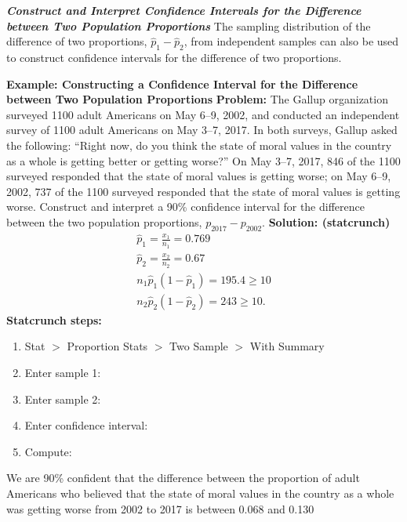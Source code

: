 \documentclass{report}
\begin{document}
    \pagebreak \bigbreak \noindent 
    \textbf{\textit{Construct and Interpret Confidence Intervals for the Difference between Two Population Proportions}}
    \bigbreak \noindent 
    The sampling distribution of the difference of two proportions, $\hat{p}_1 - \hat{p}_2$, from independent samples can also be used to construct confidence intervals for the difference of two proportions.
    \bigbreak \noindent 
    \begin{mdframed}
      \textbf{Example: Constructing a Confidence Interval for the Difference between Two Population Proportions}
      \bigbreak \noindent 
      \textbf{Problem:}
      The Gallup organization surveyed 1100 adult Americans on May 6–9, 2002, and conducted an independent survey of 1100 adult Americans on May 3–7, 2017. In both surveys, Gallup asked the following: “Right now, do you think the state of moral values in the country as a whole is getting better or getting worse?” On May 3–7, 2017, 846 of the 1100 surveyed responded that the state of moral values is getting worse; on May 6–9, 2002, 737 of the 1100 surveyed responded that the state of moral values is getting worse. Construct and interpret a 90\% confidence interval for the difference between the two population proportions, \(p_{2017} - p_{2002}\).
      \bigbreak \noindent 
      \textbf{Solution: (statcrunch)}
      \begin{align*}
          \hat{p}_{1} = \frac{x_{1}}{n_{1}} = 0.769 \\
          \hat{p}_{2} = \frac{x_{2}}{n_{2}} = 0.67 \\
          n_{1}\hat{p}_{1}(1-\hat{p}_{1}) = 195.4 \geq 10 \\
          n_{2}\hat{p}_{2}(1-\hat{p}_{2}) = 243 \geq 10
      .\end{align*}
      \textbf{Statcrunch steps:}
      \begin{enumerate}
          \item Stat $> $ Proportion Stats $> $ Two Sample $> $ With Summary
         \item Enter sample 1:
         \item Enter sample 2:
        \item Enter confidence interval:
        \item Compute:
      \end{enumerate}
      We are 90\% confident that the difference between the proportion of adult Americans who believed that the state of moral values in the country as a whole was getting worse from 2002 to 2017 is between 0.068 and 0.130
      
    \end{mdframed}
\end{document}
